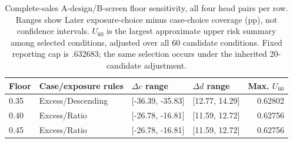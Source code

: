 \begin{table}[t]\centering\small
\caption{Complete-sales A-design/B-screen floor sensitivity, all four head pairs per row. Ranges show Later exposure-choice minus case-choice coverage (pp), not confidence intervals. $U_{60}$ is the largest approximate upper risk summary among selected conditions, adjusted over all 60 candidate conditions. Fixed reporting cap is .632683; the same selection occurs under the inherited 20-candidate adjustment.}\label{tab:v8-floor-main}
\begin{tabular}{llllr}\toprule
Floor & Case/exposure rules & $\Delta c$ range & $\Delta d$ range & Max. $U_{60}$\\\midrule
0.35 & Excess/Descending & [-36.39, -35.83] & [12.77, 14.29] & 0.62802 \\
0.40 & Excess/Ratio & [-26.78, -16.81] & [11.59, 12.72] & 0.62756 \\
0.45 & Excess/Ratio & [-26.78, -16.81] & [11.59, 12.72] & 0.62756 \\
\bottomrule\end{tabular}\end{table}
